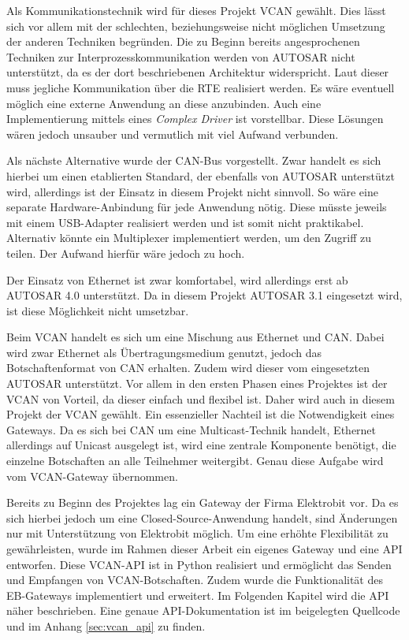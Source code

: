 \documentclass[
  a4paper,					    %
  twoside,
  DIV=calc,     				%
  bibliography=totoc,
  cleardoublepage=empty,
  ngerman,     					%
  final       					%
]{scrbook}
\begin{document}
Als Kommunikationstechnik wird für dieses Projekt VCAN gewählt. Dies lässt sich vor allem mit der schlechten, beziehungsweise nicht möglichen Umsetzung der anderen Techniken begründen. Die zu Beginn bereits angesprochenen Techniken zur Interprozesskommunikation werden von AUTOSAR nicht unterstützt, da es der dort beschriebenen Architektur widerspricht. Laut dieser muss jegliche Kommunikation über die RTE realisiert werden. Es wäre eventuell möglich eine externe Anwendung an diese anzubinden. Auch eine Implementierung mittels eines \emph{Complex Driver} ist vorstellbar. Diese Lösungen wären jedoch unsauber und vermutlich mit viel Aufwand verbunden.

Als nächste Alternative wurde der CAN-Bus vorgestellt. Zwar handelt es sich hierbei um einen etablierten Standard, der ebenfalls von AUTOSAR unterstützt wird, allerdings ist der Einsatz in diesem Projekt nicht sinnvoll. So wäre eine separate Hardware-Anbindung für jede Anwendung nötig. Diese müsste jeweils mit einem USB-Adapter realisiert werden und ist somit nicht praktikabel. Alternativ könnte ein Multiplexer implementiert werden, um den Zugriff zu teilen. Der Aufwand hierfür wäre jedoch zu hoch.

Der Einsatz von Ethernet ist zwar komfortabel, wird allerdings erst ab AUTOSAR 4.0 unterstützt. Da in diesem Projekt AUTOSAR 3.1 eingesetzt wird, ist diese Möglichkeit nicht umsetzbar.

Beim VCAN handelt es sich um eine Mischung aus Ethernet und CAN. Dabei wird zwar Ethernet als Übertragungsmedium genutzt, jedoch das Botschaftenformat von CAN erhalten. Zudem wird dieser vom eingesetzten AUTOSAR unterstützt. Vor allem in den ersten Phasen eines Projektes ist der VCAN von Vorteil, da dieser einfach und flexibel ist. Daher wird auch in diesem Projekt der VCAN gewählt. Ein essenzieller Nachteil ist die Notwendigkeit eines Gateways. Da es sich bei CAN um eine Multicast-Technik handelt, Ethernet allerdings auf Unicast ausgelegt ist, wird eine zentrale Komponente benötigt, die einzelne Botschaften an alle Teilnehmer weitergibt. Genau diese Aufgabe wird vom VCAN-Gateway übernommen. 

Bereits zu Beginn des Projektes lag ein Gateway der Firma Elektrobit vor. Da es sich hierbei jedoch um eine Closed-Source-Anwendung handelt, sind Änderungen nur mit Unterstützung von Elektrobit möglich. Um eine erhöhte Flexibilität zu gewährleisten, wurde im Rahmen dieser Arbeit ein eigenes Gateway und eine API entworfen. Diese VCAN-API ist in Python realisiert und ermöglicht das Senden und Empfangen von VCAN-Botschaften. Zudem wurde die Funktionalität des EB-Gateways implementiert und erweitert. Im Folgenden Kapitel wird die API näher beschrieben. Eine genaue API-Dokumentation ist im beigelegten Quellcode und im Anhang \ref{sec:vcan_api} zu finden.
\end{document}
